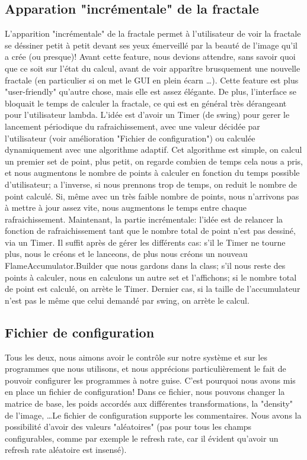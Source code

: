 \documentclass[a4paper]{article}
\begin{document}
\subsection*{Apparation "incrémentale" de la fractale}
L'apparition "incrémentale" de la fractale permet à l'utilisateur de voir la fractale se déssiner petit à petit devant ses yeux émerveillé par la beauté de l'image qu'il a crée (ou presque)! Avant cette feature, nous devions attendre, sans savoir quoi que ce soit sur l'état du calcul, avant de voir apparître brusquement une nouvelle fractale (en particulier si on met le GUI en plein écarn \ldots). Cette feature est plus "user-friendly" qu'autre chose, mais elle est assez élégante. De plus, l'interface se bloquait le temps de calculer la fractale, ce qui est en général très dérangeant pour l'utilisateur lambda.
L'idée est d'avoir un Timer (de swing) pour gerer le lancement périodique du rafraichissement, avec une valeur décidée par l'utilisateur (voir amélioration "Fichier de configuration") ou calculée dynamiquement avec une algorithme adaptif. Cet algorithme est simple, on calcul un premier set de point, plus petit, on regarde combien de temps cela nous a pris, et nous augmentons le nombre de points à calculer en fonction du temps possible d'utilisateur; a l'inverse, si nous prennons trop de temps, on reduit le nombre de point calculé. Si, même avec un très faible nombre de points, nous n'arrivons pas à mettre à jour assez vite, nous augmentons le temps entre chaque rafraichissement. Maintenant, la partie incrémentale: l'idée est de relancer la fonction de rafraichissement tant que le nombre total de point n'est pas dessiné, via un Timer. Il suffit après de gérer les différents cas: s'il le Timer ne tourne plus, nous le créons et le lanceons, de plus nous créons un nouveau FlameAccumulator.Builder que nous gardons dans la class; s'il nous reste des points à calculer, nous en calculons un autre set et l'affichons; si le nombre total de point est calculé, on arrète le Timer. Dernier cas, si la taille de l'accumulateur n'est pas le même que celui demandé par swing, on arrète le calcul.

\subsection*{Fichier de configuration}
Tous les deux, nous aimons avoir le contrôle sur notre système et sur les programmes que nous utilisons, et nous apprécions particulièrement le fait de pouvoir configurer les programmes à notre guise. C'est pourquoi nous avons mis en place un fichier de configuration! Dans ce fichier, nous pouvons changer la matrice de base, les poids accordés aux différentes transformations, la "density" de l'image, \ldots Le fichier de configuration supporte les commentaires. Nous avons la possibilité d'avoir des valeurs "aléatoires" (pas pour tous les champs configurables, comme par exemple le refresh rate, car il évident qu'avoir un refresh rate aléatoire est insensé).
\end{document}
